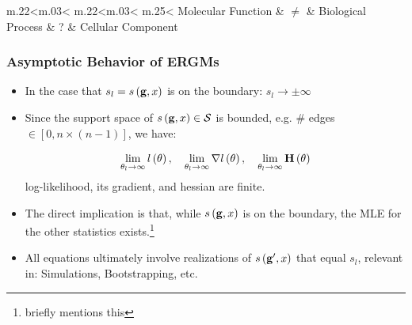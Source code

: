 \documentclass[aspectratio=169, 9pt, handout]{beamer}
\begin{document}
\begin{frame}[c,label=aphylo-table]
\begin{minipage}[m]{.44\linewidth}
		
		
		\small
		\begin{table}
			\begin{tabular}{%
					m{.22\linewidth}<\centering m{.03\linewidth}<\centering%
					m{.22\linewidth}<\centering m{.03\linewidth}<\centering%
					m{.25\linewidth}<\centering%
				}
				Molecular Function & $\neq$ & Biological Process &  ? & Cellular Component
			\end{tabular}
		\end{table}
		\normalsize
		
		
	\end{minipage}
	
	
	
\end{frame}

\begin{frame}[label=discrete-exponential-theory]
	\frametitle{Asymptotic Behavior of ERGMs}
	
	\begin{itemize}
		\item In the case that $s_l = s\left(\mathbf{g}, x\right)$ is on the boundary: $s_l \to \pm\infty$\pause
		\item Since the support space of $s\left(\mathbf{g}, x\right)\in\mathcal{S}$ is bounded, e.g. \# edges $\in [0,n\times (n - 1)]$, we have: \pause
		
		\begin{equation*}
		\lim_{\theta_l\to\infty}\loglik{\theta}, \quad %
		\lim_{\theta_l\to\infty}\nabla\loglik{\theta}, \quad %
		\lim_{\theta_l\to\infty}\mathbf{H}\left(\theta\right)
		\end{equation*}
		log-likelihood, its gradient, and hessian are finite.\pause
		\item The direct implication is that, while $s\left(\mathbf{g}, x\right)$ is on the boundary, the MLE for the other statistics exists.\footnote{\cite{Handcock2003} briefly mentions this}\pause
		\item All equations ultimately involve realizations of $s\left(\mathbf{g}', x\right)$ that equal $s_l$, relevant in: Simulations, Bootstrapping, etc.
	\end{itemize}
	
	\vfill\hfill\hyperlink{discrete-exponential}{}
	
\end{frame}
\end{document}
